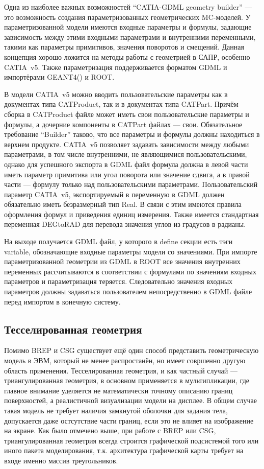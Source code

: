 Одна из наиболее важных возможностей ``CATIA-GDML geometry builder'' --- это возможность создания параметризованных геометрических MC-моделей. У параметризованной модели имеются входные параметры и формулы, задающие зависимость между этими входными параметрами и внутренними переменными, такими как параметры примитивов, значения поворотов и смещений. Данная концепция хорошо ложится на методы работы с геометрией в САПР, особенно CATIA~v5. Также параметризация поддерживается форматом GDML и импортёрами GEANT4(\todo) и ROOT.

В модели CATIA~v5 можно вводить пользовательские параметры как в документах типа CATProduct, так и в документах типа CATPart. Причём сборка в CATProduct файле может иметь свои пользовательские параметры и формулы, а дочерние компоненты в CATPart файлах --- свои. Обязательное требование ``Builder'' таково, что все параметры и формулы должны находиться в верхнем продукте. CATIA~v5 позволяет задавать зависимости между любыми параметрами, в том числе внутренними, не являющимися пользовательскими, однако для успешного экспорта в GDML файл формула должна в левой части иметь параметр примитива или угол поворота или значение сдвига, а в правой части --- формулу только над пользовательскими параметрами. Пользовательский параметр CATIA~v5, экспортируемый в переменную в GDML должен обязательно иметь безразмерный тип Real. В связи с этим имеются правила оформления формул и приведения единиц измерения. Также имеется стандартная переменная DEGtoRAD для перевода значения углов из градусов в радианы.

На выходе получается GDML файл, у которого в define секции есть тэги variable, обозначающие входные параметры модели со значениями. При импорте параметризованной геометрии из GDML в ROOT все значения внутренних переменных рассчитываются в соответствии с формулами по значениям входных параметров и параметризация теряется. Следовательно значения входных параметров должны задаваться пользователем непосредственно в GDML файле перед импортом в конечную систему.

\subsection{Тесселированная геометрия}\label{sec:Tesselated}

Помимо BREP и CSG существует ещё один способ представить геометрическую модель в ЭВМ, который не менее распростанён, но имеет совршенно другую область применения. Тесселированная геометрия, и как частный случай --- триангулированная геометрия, в основном применяется в мультипликации, где главное внимание уделяется не математически точному описанию границ поверхностей, а реалистичной визуализации модели на дисплее. В общем случае такая модель не требует наличия замкнутой оболочки для задания тела, допускается даже остсутствие части границ, если это не влияет на изображение на экране. Как было отмечено выше, при работе с BREP или CSG, триангулированная геометрия всегда строится графической подсистемой того или иного пакета моделирования, т.к. архитектура графической карты требует на входе именно массив треугольников.

